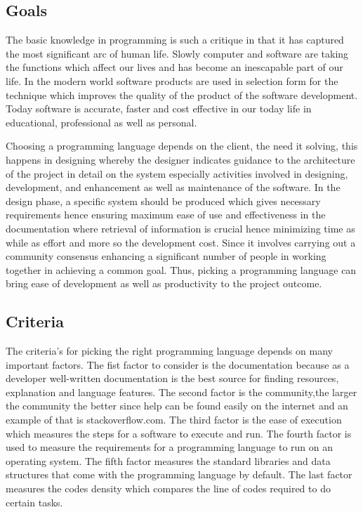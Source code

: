 \documentclass{scrreprt}
\begin{document}
\subsection{Goals}
The basic knowledge in programming is such a critique in that it has captured the most significant arc of
human life. Slowly computer and software are taking the functions which affect our lives and has
become an inescapable part of our life. In the modern world software products are used in selection
form for the technique which improves the quality of the product of the software development. Today
software is accurate, faster and cost effective in our today life in educational, professional as well as
personal.

Choosing a programming language depends on the client, the need it solving, this happens in designing
whereby the designer indicates guidance to the architecture of the project in detail on the system
especially activities involved in designing, development, and enhancement as well as maintenance of the
software. In the design phase, a specific system should be produced which gives necessary requirements
hence ensuring maximum ease of use and effectiveness in the documentation where retrieval of
information is crucial hence minimizing time as while as effort and more so the development cost. Since
it involves carrying out a community consensus enhancing a significant number of people in working
together in achieving a common goal. Thus, picking a programming language can bring ease of
development as well as productivity to the project outcome.

\subsection{Criteria}
The criteria’s for picking the right programming language depends on many important factors. The fist
factor to consider is the documentation because as a developer well-written documentation is the best
source for finding resources, explanation and language features. The second factor is the community,the larger the community the better since help can be found easily on the internet and an example of
that is stackoverflow.com. The third factor is the ease of execution which measures the steps for a
software to execute and run. The fourth factor is used to measure the requirements for a programming
language to run on an operating system. The fifth factor measures the standard libraries and data
structures that come with the programming language by default. The last factor measures the codes
density which compares the line of codes required to do certain tasks.
\end{document}
